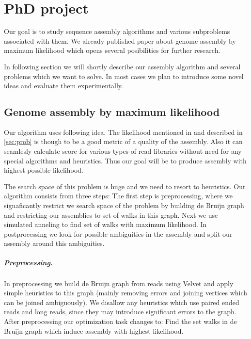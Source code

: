 \chapter{PhD project}

Our goal is to study sequence assembly algorithms and
various subproblems associated with them.
We already published paper about genome assembly by maximum likelihood \cite{GAML}
which opens several posibilities for further research.

In following section we will shortly describe our assembly algorithm
and several problems which we want to solve.
In most cases we plan to introduce some novel ideas
and evaluate them experimentally.

\section{Genome assembly by maximum likelihood}

Our algorithm uses following idea.
The likelihood  mentioned in \cite{Ghodsi2013} and described in \ref{sec:prob} 
is though to be a good metric of a quality of the assembly.
Also it can seamlesly calculate score for various types of read libraries without need
for any special algorithms and heuristics. 
Thus our goal will be to produce assembly with highest possible likelihood.

The search space of this problem is huge and we need to resort to heuristics.
Our algorithm consists from three steps:
The first step is preprocessing, where we signaficantly restrict we search space of the problem
by building de Bruijn graph and restricting our assemblies to set of walks
in this graph. Next we use simulated anneling to find set of walks
with maximum likelihood. In postprocessing we look for possible
ambiguities in the assembly and split our assembly around this ambiguities.

\paragraph{Preprocessing.} In preprocessing we build de Bruijn graph from reads
using Velvet \cite{Velvet} and apply simple heuristics to this graph
 (mainly removing errors and joining vertices which can be joined ambiguously).
We disallow any heuristics which use paired ended reads and long reads,
since they may introduce significant errors to the graph.
After preprocessing our optimization task changes to: Find the set walks
in de Bruijn graph which induce assembly with highest likelihood.

